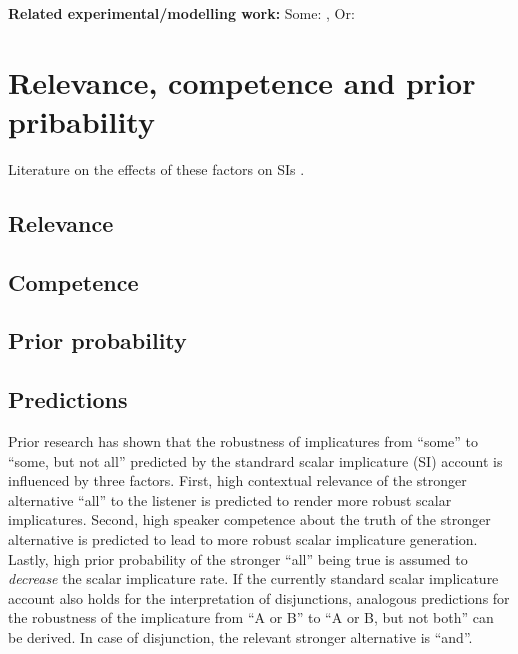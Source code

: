 \documentclass{sp}
\begin{document}
\textbf{Related experimental/modelling work: } 
Some: \citep{degen2015investigating}, 
Or: \citep{Li2021}

\section{Relevance, competence and prior pribability}
Literature on the effects of these factors on SIs \citep{sperber1986relevance, goodman2013knowledge, degen2015wonky}. 
\subsection{Relevance}

\subsection{Competence}

\subsection{Prior probability}

\subsection{Predictions}
Prior research has shown that the robustness of implicatures from ``some'' to ``some, but not all''  predicted by the standrard scalar implicature (SI) account is influenced by three factors. First, high contextual relevance of the stronger alternative ``all'' to the listener is predicted to render more robust scalar implicatures. Second, high speaker competence about the truth of the stronger alternative is predicted to lead to more robust scalar implicature generation. Lastly, high prior probability of the stronger ``all'' being true is assumed to \textit{decrease} the scalar implicature rate.
If the currently standard scalar implicature account also holds for the interpretation of disjunctions, analogous predictions for the robustness of the implicature from ``A or B'' to ``A or B, but not both'' can be derived. In case of disjunction, the relevant stronger alternative is ``and''. 
\end{document}
